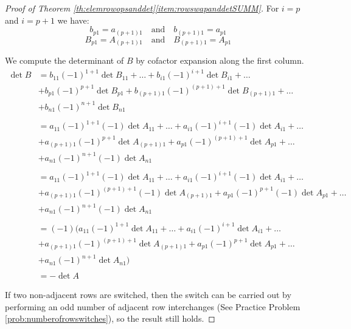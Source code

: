\documentclass{ximera}
\begin{document}
\begin{proof}[Proof of Theorem \ref{th:elemrowopsanddet}\ref{item:rowswapanddetSUMM}]
 For $i=p$ and $i=p+1$ we have:
 $$b_{p1}=a_{(p+1)1}\quad\text{and}\quad b_{(p+1)1}=a_{p1}$$
 $$B_{p1}=A_{(p+1)1}\quad\text{and}\quad B_{(p+1)1}=A_{p1}$$
 
 We compute the determinant of $B$ by cofactor expansion along the first column.
 \begin{align*}
 \det{B}&=b_{11}(-1)^{1+1}\det{B_{11}}+\ldots +b_{i1}(-1)^{i+1}\det{B_{i1}}+\ldots\\
 &+b_{p1}(-1)^{p+1}\det{B_{p1}}+b_{(p+1)1}(-1)^{(p+1)+1}\det{B_{(p+1)1}}+\ldots\\
 &+b_{n1}(-1)^{n+1}\det{B_{n1}}\\
 \\
 &=a_{11}(-1)^{1+1}(-1)\det{A_{11}}+\ldots +a_{i1}(-1)^{i+1}(-1)\det{A}_{i1}+\ldots\\
 &+a_{(p+1)1}(-1)^{p+1}\det{A_{(p+1)1}}+a_{p1}(-1)^{(p+1)+1}\det{A_{p1}}+\ldots\\
 &+a_{n1}(-1)^{n+1}(-1)\det{A_{n1}}\\
 \\
 &=a_{11}(-1)^{1+1}(-1)\det{A_{11}}+\ldots +a_{i1}(-1)^{i+1}(-1)\det{A_{i1}}+\ldots\\
 &+a_{(p+1)1}(-1)^{(p+1)+1}(-1)\det{A_{(p+1)1}}+a_{p1}(-1)^{p+1}(-1)\det{A_{p1}}+\ldots\\
 &+a_{n1}(-1)^{n+1}(-1)\det{A_{n1}}\\
 \\
 &=(-1)\Big(a_{11}(-1)^{1+1}\det{A_{11}}+\ldots +a_{i1}(-1)^{i+1}\det{A_{i1}}+\ldots\\
 &+a_{(p+1)1}(-1)^{(p+1)+1}\det{A_{(p+1)1}}+a_{p1}(-1)^{p+1}\det{A_{p1}}+\ldots\\
 &+a_{n1}(-1)^{n+1}\det{A_{n1}}\Big)\\
 \\
 &=-\det{A}
 \end{align*}
 
 If two non-adjacent rows are switched, then the switch can be carried out by performing an odd number of adjacent row interchanges (See Practice Problem \ref{prob:numberofrowswitches}), so the result still holds.
\end{proof}
\end{document}
